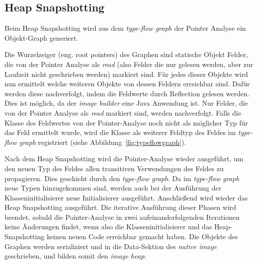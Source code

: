 \subsection{Heap Snapshotting}
\label{subsec:heapsnapshotting}
Beim Heap Snapshotting wird aus dem \textit{type-flow graph} der Pointer Analyse ein Objekt-Graph generiert.

Die Wurzelzeiger (eng. root pointers) des Graphen sind statische Objekt Felder, die von der Pointer Analyse als \textit{read} (also Felder die nur gelesen werden, 
aber zur Laufzeit nicht geschrieben werden) markiert sind. Für jedes dieser Objekte wird nun ermittelt welche weiteren Objekte von dessen Feldern erreichbar sind. 
Dafür werden diese nachverfolgt, indem die Feldwerte durch Reflection gelesen werden. Dies ist möglich, da der \textit{image builder} eine Java Anwendung ist.
 Nur Felder, die von der Pointer Analyse als \textit{read} markiert sind, werden nachverfolgt. Falls die Klasse des Feldwertes von der Pointer-Analyse noch nicht als möglicher Typ für das Feld ermittelt 
 wurde, wird die Klasse als weiterer Feldtyp des Feldes im \textit{type-flow graph} registriert (siehe Abbildung~\ref{fig:typeflowgraph}).

Nach dem Heap Snapshotting wird die Pointer-Analyse wieder ausgeführt, um den neuen Typ des Feldes allen transitiven Verwendungen des Feldes zu propagieren. Dies geschieht durch den \textit{type-flow graph}. 
Da im \textit{type-flow graph} neue Typen hinzugekommen sind, werden auch bei der Ausführung der Klasseninitialisierer neue Initialisierer ausgeführt. Anschließend wird wieder das Heap Snapshotting ausgeführt. 
Die iterative Ausführung dieser Phasen wird beendet, sobald die Pointer-Analyse in zwei aufeinanderfolgenden Iterationen keine Änderungen findet, wenn also die Klasseninitialisierer und das Heap-Snapshotting 
keinen neuen Code erreichbar gemacht haben.
Die Objekte des Graphen werden serializiert und in die Data-Sektion des \textit{native image} geschrieben, und bilden somit den \textit{image heap}\parencite{Wimmer2019}.
